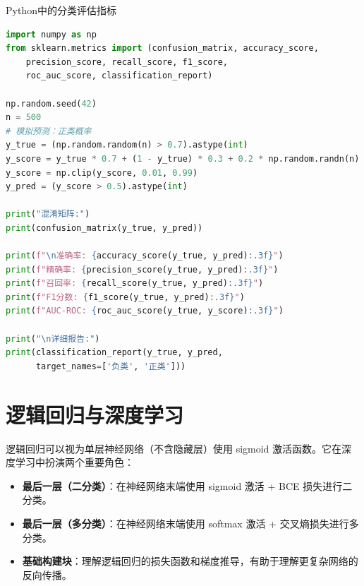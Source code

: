 \begin{mycode}{Python中的分类评估指标}
\begin{lstlisting}[language=Python]
import numpy as np
from sklearn.metrics import (confusion_matrix, accuracy_score,
    precision_score, recall_score, f1_score,
    roc_auc_score, classification_report)

np.random.seed(42)
n = 500
# 模拟预测：正类概率
y_true = (np.random.random(n) > 0.7).astype(int)
y_score = y_true * 0.7 + (1 - y_true) * 0.3 + 0.2 * np.random.randn(n)
y_score = np.clip(y_score, 0.01, 0.99)
y_pred = (y_score > 0.5).astype(int)

print("混淆矩阵:")
print(confusion_matrix(y_true, y_pred))

print(f"\n准确率: {accuracy_score(y_true, y_pred):.3f}")
print(f"精确率: {precision_score(y_true, y_pred):.3f}")
print(f"召回率: {recall_score(y_true, y_pred):.3f}")
print(f"F1分数: {f1_score(y_true, y_pred):.3f}")
print(f"AUC-ROC: {roc_auc_score(y_true, y_score):.3f}")

print("\n详细报告:")
print(classification_report(y_true, y_pred,
      target_names=['负类', '正类']))
\end{lstlisting}
\end{mycode}

\section{逻辑回归与深度学习}

逻辑回归可以视为单层神经网络（不含隐藏层）使用 sigmoid 激活函数。它在深度学习中扮演两个重要角色：

\begin{itemize}
    \item \textbf{最后一层（二分类）}：在神经网络末端使用 sigmoid 激活 + BCE 损失进行二分类。
    \item \textbf{最后一层（多分类）}：在神经网络末端使用 softmax 激活 + 交叉熵损失进行多分类。
    \item \textbf{基础构建块}：理解逻辑回归的损失函数和梯度推导，有助于理解更复杂网络的反向传播。
\end{itemize}

